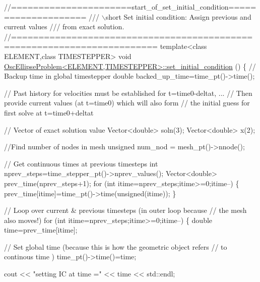 \begin{DoxyCodeInclude}
\textcolor{comment}{//======================start\_of\_set\_initial\_condition====================}
\textcolor{comment}{/// \(\backslash\)short Set initial condition: Assign previous and current values}
\textcolor{comment}{}\textcolor{comment}{/// from exact solution.}
\textcolor{comment}{}\textcolor{comment}{//========================================================================}
\textcolor{keyword}{template}<\textcolor{keyword}{class} ELEMENT,\textcolor{keyword}{class} TIMESTEPPER>
\textcolor{keywordtype}{void} \hyperlink{classOscEllipseProblem_ae638f238a7b0e0acb5d6087b7363fe01}{OscEllipseProblem<ELEMENT,TIMESTEPPER>::set\_initial\_condition}
      ()
\{ 
 \textcolor{comment}{// Backup time in global timestepper}
 \textcolor{keywordtype}{double} backed\_up\_time=time\_pt()->time();
   
 \textcolor{comment}{// Past history for velocities must be established for t=time0-deltat, ...}
 \textcolor{comment}{// Then provide current values (at t=time0) which will also form}
 \textcolor{comment}{// the initial guess for first solve at t=time0+deltat}
 
 \textcolor{comment}{// Vector of exact solution value}
 Vector<double> soln(3);
 Vector<double> x(2);
 
 \textcolor{comment}{//Find number of nodes in mesh}
 \textcolor{keywordtype}{unsigned} num\_nod = mesh\_pt()->nnode();
 
 \textcolor{comment}{// Get continuous times at previous timesteps}
 \textcolor{keywordtype}{int} nprev\_steps=time\_stepper\_pt()->nprev\_values();
 Vector<double> prev\_time(nprev\_steps+1);
 \textcolor{keywordflow}{for} (\textcolor{keywordtype}{int} itime=nprev\_steps;itime>=0;itime--)
  \{
   prev\_time[itime]=time\_pt()->time(\textcolor{keywordtype}{unsigned}(itime));
  \}
 
 \textcolor{comment}{// Loop over current & previous timesteps (in outer loop because}
 \textcolor{comment}{// the mesh also moves!)}
 \textcolor{keywordflow}{for} (\textcolor{keywordtype}{int} itime=nprev\_steps;itime>=0;itime--)
  \{
   \textcolor{keywordtype}{double} time=prev\_time[itime];
   
   \textcolor{comment}{// Set global time (because this is how the geometric object refers }
   \textcolor{comment}{// to continous time )}
   time\_pt()->time()=time;
   
   cout << \textcolor{stringliteral}{"setting IC at time ="} << time << std::endl;
   

\end{DoxyCodeInclude}
